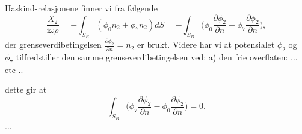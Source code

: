 Haskind-relasjonene finner vi fra følgende 
\begin{equation}
\frac{X_2}{\mathrm{i} \omega \rho}  =  - \int_{S_B}  ( \phi_0 n_2 + \phi_7 n_2) dS = - \int_{S_B}  \Big( \phi_0 \frac{\partial \phi_2}{\partial n} + \phi_7 \frac{\partial \phi_2}{\partial n} \Big),
\end{equation}
der grenseverdibetingelsen $\frac{\partial \phi_2}{\partial n} = n_2$ er brukt. Videre har vi at potensialet $\phi_2$ og $\phi_7$ tilfredstiller den samme grenseverdibetingelsen ved: a) den frie overflaten: 
... etc ..

dette gir at 
\begin{equation}
\int_{S_B}  \big( \phi_7 \frac{\partial \phi_2}{\partial n} -\phi_0 \frac{\partial \phi_2}{\partial n}  \big) = 0. 
\end{equation}
...